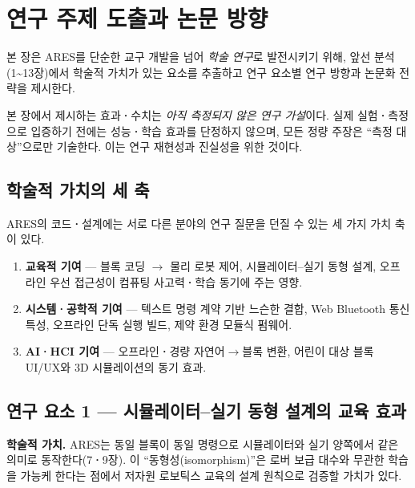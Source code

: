 \section{연구 주제 도출과 논문 방향}

본 장은 ARES를 단순한 교구 개발을 넘어 \emph{학술 연구}로 발전시키기 위해,
앞선 분석(1\textasciitilde 13장)에서 학술적 가치가 있는 요소를 추출하고 연구
요소별 연구 방향과 논문화 전략을 제시한다.

\begin{infobox}[title=서술 원칙]
본 장에서 제시하는 효과\textbf{·}수치는 \emph{아직 측정되지 않은 연구 가설}이다.
실제 실험\textbf{·}측정으로 입증하기 전에는 성능\textbf{·}학습 효과를 단정하지 않으며,
모든 정량 주장은 ``측정 대상''으로만 기술한다. 이는 연구 재현성과 진실성을 위한 것이다.
\end{infobox}

\subsection{학술적 가치의 세 축}

ARES의 코드\textbf{·}설계에는 서로 다른 분야의 연구 질문을 던질 수 있는 세 가지
가치 축이 있다.

\begin{enumerate}
  \item \textbf{교육적 기여} --- 블록 코딩 $\to$ 물리 로봇 제어, 시뮬레이터--실기
        동형 설계, 오프라인 우선 접근성이 컴퓨팅 사고력\textbf{·}학습 동기에 주는 영향.
  \item \textbf{시스템\textbf{·}공학적 기여} --- 텍스트 명령 계약 기반 느슨한 결합,
        Web Bluetooth 통신 특성, 오프라인 단독 실행 빌드, 제약 환경 모듈식 펌웨어.
  \item \textbf{AI\textbf{·}HCI 기여} --- 오프라인\textbf{·}경량 자연어$\to$블록 변환,
        어린이 대상 블록 UI/UX와 3D 시뮬레이션의 동기 효과.
\end{enumerate}

\subsection{연구 요소 1 --- 시뮬레이터--실기 동형 설계의 교육 효과}

\noindent\textbf{학술적 가치.} ARES는 동일 블록이 동일 명령으로 시뮬레이터와
실기 양쪽에서 같은 의미로 동작한다(7\textbf{·}9장). 이 ``동형성(isomorphism)''은
로버 보급 대수와 무관한 학습을 가능케 한다는 점에서 저자원 로보틱스 교육의
설계 원칙으로 검증할 가치가 있다.


